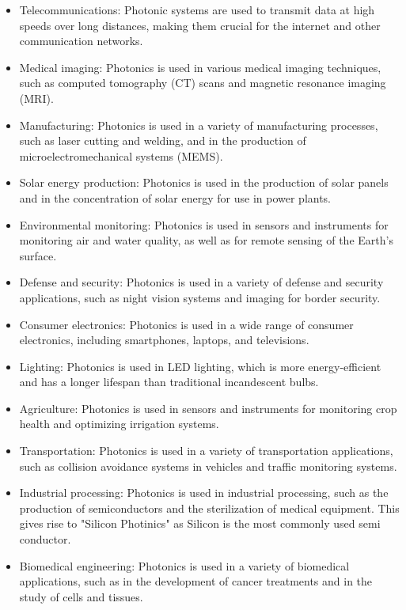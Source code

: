 \documentclass[a4paper]{article}
\begin{document}
    \begin{itemize}
        \item Telecommunications: Photonic systems are used to transmit data at high speeds over long distances, making them crucial for the internet and other communication networks.
        \item Medical imaging: Photonics is used in various medical imaging techniques, such as computed tomography (CT) scans and magnetic resonance imaging (MRI).
        \item Manufacturing: Photonics is used in a variety of manufacturing processes, such as laser cutting and welding, and in the production of microelectromechanical systems (MEMS).
        \item Solar energy production: Photonics is used in the production of solar panels and in the concentration of solar energy for use in power plants.
        \item Environmental monitoring: Photonics is used in sensors and instruments for monitoring air and water quality, as well as for remote sensing of the Earth's surface.
        \item Defense and security: Photonics is used in a variety of defense and security applications, such as night vision systems and imaging for border security.
        \item Consumer electronics: Photonics is used in a wide range of consumer electronics, including smartphones, laptops, and televisions.
        \item Lighting: Photonics is used in LED lighting, which is more energy-efficient and has a longer lifespan than traditional incandescent bulbs.
        \item Agriculture: Photonics is used in sensors and instruments for monitoring crop health and optimizing irrigation systems.
        \item Transportation: Photonics is used in a variety of transportation applications, such as collision avoidance systems in vehicles and traffic monitoring systems.
        \item Industrial processing: Photonics is used in industrial processing, such as the production of semiconductors and the sterilization of medical equipment. This gives rise to "Silicon Photinics" as Silicon is the most commonly used semi conductor.
        \item Biomedical engineering: Photonics is used in a variety of biomedical applications, such as in the development of cancer treatments and in the study of cells and tissues.

\end{itemize}
\end{document}
